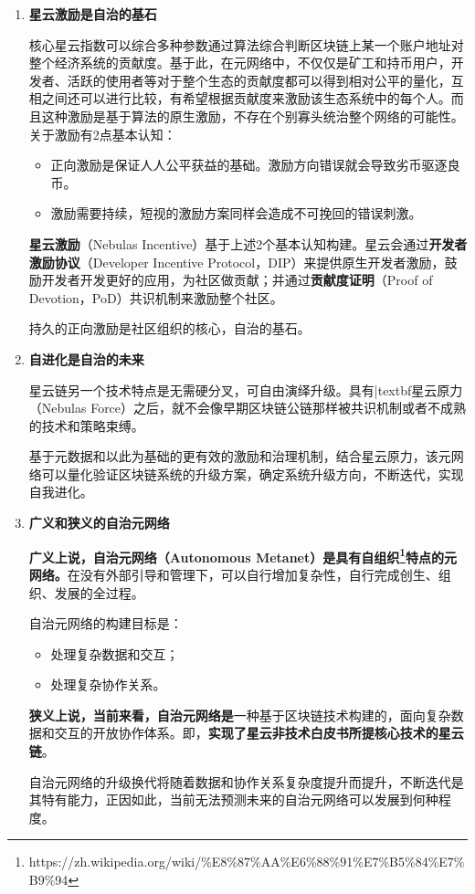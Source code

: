 \begin{enumerate}
	\item \textbf{星云激励是自治的基石}
	
	核心星云指数可以综合多种参数通过算法综合判断区块链上某一个账户地址对整个经济系统的贡献度。基于此，在元网络中，不仅仅是矿工和持币用户，开发者、活跃的使用者等对于整个生态的贡献度都可以得到相对公平的量化，互相之间还可以进行比较，有希望根据贡献度来激励该生态系统中的每个人。而且这种激励是基于算法的原生激励，不存在个别寡头统治整个网络的可能性。
	关于激励有2点基本认知：
	\begin{itemize}
		\item 正向激励是保证人人公平获益的基础。激励方向错误就会导致劣币驱逐良币。
		\item 激励需要持续，短视的激励方案同样会造成不可挽回的错误刺激。
	\end{itemize}
	\textbf{星云激励}（Nebulas Incentive）基于上述2个基本认知构建。星云会通过\textbf{开发者激励协议}（Developer Incentive Protocol，DIP）来提供原生开发者激励，鼓励开发者开发更好的应用，为社区做贡献；并通过\textbf{贡献度证明}（Proof of Devotion，PoD）共识机制来激励整个社区。
	
	持久的正向激励是社区组织的核心，自治的基石。
	
	\item \textbf{自进化是自治的未来}
	
	星云链另一个技术特点是无需硬分叉，可自由演绎升级。具有|textbf{星云原力}（Nebulas Force）之后，就不会像早期区块链公链那样被共识机制或者不成熟的技术和策略束缚。
	
	基于元数据和以此为基础的更有效的激励和治理机制，结合星云原力，该元网络可以量化验证区块链系统的升级方案，确定系统升级方向，不断迭代，实现自我进化。
	
	\item \textbf{广义和狭义的自治元网络}
	
	\textbf{广义上说，自治元网络（Autonomous Metanet）是具有自组织\footnote{https://zh.wikipedia.org/wiki/\%E8\%87\%AA\%E6\%88\%91\%E7\%B5\%84\%E7\%B9\%94}特点的元网络。}在没有外部引导和管理下，可以自行增加复杂性，自行完成创生、组织、发展的全过程。
	
	自治元网络的构建目标是：
	\begin{itemize}
		\item 处理复杂数据和交互；
	    \item 处理复杂协作关系。
	\end{itemize}
	\textbf{狭义上说，当前来看，自治元网络是}一种基于区块链技术构建的，面向复杂数据和交互的开放协作体系。即，\textbf{实现了星云非技术白皮书所提核心技术的星云链}。
	
	自治元网络的升级换代将随着数据和协作关系复杂度提升而提升，不断迭代是其特有能力，正因如此，当前无法预测未来的自治元网络可以发展到何种程度。
\end{enumerate}


